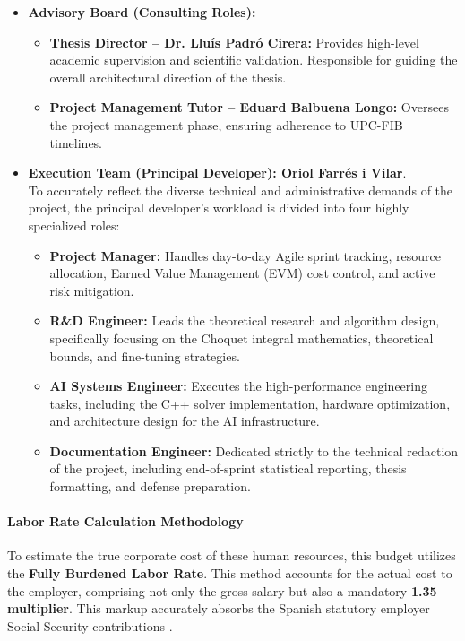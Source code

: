 \begin{itemize}
    \item \textbf{Advisory Board (Consulting Roles):}
    \begin{itemize}
        \item \textbf{Thesis Director -- Dr. Lluís Padró Cirera:} Provides high-level academic supervision and scientific validation. Responsible for guiding the overall architectural direction of the thesis.
        \item \textbf{Project Management Tutor -- Eduard Balbuena Longo:} Oversees the project management phase, ensuring adherence to UPC-FIB timelines.
    \end{itemize}
    
    \vspace{0.5em}
    \item \textbf{Execution Team (Principal Developer): Oriol Farrés i Vilar}. \\
    To accurately reflect the diverse technical and administrative demands of the project, the principal developer's workload is divided into four highly specialized roles:
    \begin{itemize}
        \item \textbf{Project Manager:} Handles day-to-day Agile sprint tracking, resource allocation, Earned Value Management (EVM) cost control, and active risk mitigation.
        \item \textbf{R\&D Engineer:} Leads the theoretical research and algorithm design, specifically focusing on the Choquet integral mathematics, theoretical bounds, and fine-tuning strategies.
        \item \textbf{AI Systems Engineer:} Executes the high-performance engineering tasks, including the C++ solver implementation, hardware optimization, and architecture design for the AI infrastructure.
        \item \textbf{Documentation Engineer:} Dedicated strictly to the technical redaction of the project, including end-of-sprint statistical reporting, thesis formatting, and defense preparation.
    \end{itemize}
\end{itemize}

\paragraph{Labor Rate Calculation Methodology}
To estimate the true corporate cost of these human resources, this budget utilizes the \textbf{Fully Burdened Labor Rate}. This method accounts for the actual cost to the employer, comprising not only the gross salary but also a mandatory \textbf{1.35 multiplier}. This markup accurately absorbs the Spanish statutory employer Social Security contributions \cite{boe_cotizacion_2024}.

